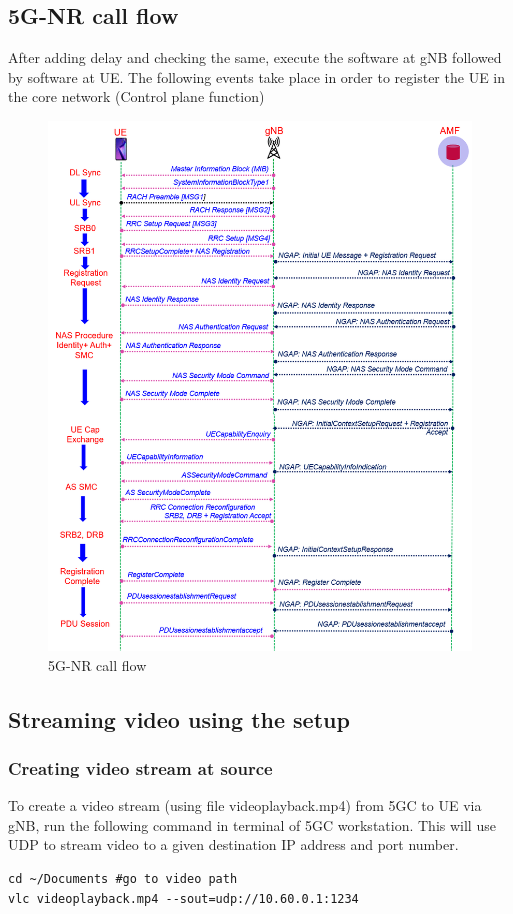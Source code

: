 \subsection{5G-NR call flow}
After adding delay and checking the same, execute the software at gNB followed by software at UE. The following events take place in order to register the UE in the core network (Control plane function)
\begin{figure}[h!]
\centering
\includegraphics[width=0.9\columnwidth]{./Figures/5G_Call_Flow.png}
\caption{5G-NR call flow}
\label{5G_Call_Flow}
\end{figure}

\subsection{Streaming video using the setup}
\subsubsection{Creating video stream at source}
To create a video stream (using file videoplayback.mp4) from 5GC to UE via gNB, run the following command in terminal of 5GC workstation. This will use UDP to stream video to a given destination IP address and port number.
\begin{lstlisting}
cd ~/Documents #go to video path
vlc videoplayback.mp4 --sout=udp://10.60.0.1:1234
\end{lstlisting}
